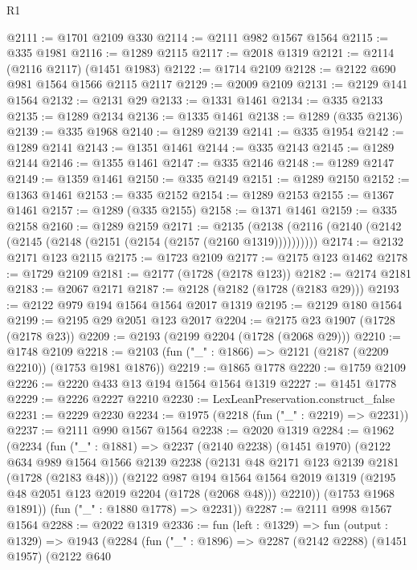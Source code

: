 \begin{lexlean}{R1}
\begin{coremodule}
@2111 := @1701 @2109 @330
@2114 := @2111 @982 @1567 @1564
@2115 := @335 @1981
@2116 := @1289 @2115
@2117 := @2018 @1319
@2121 := @2114 (@2116 @2117) (@1451 @1983)
@2122 := @1714 @2109
@2128 := @2122 @690 @981 @1564 @1566 @2115 @2117
@2129 := @2009 @2109
@2131 := @2129 @141 @1564
@2132 := @2131 @29
@2133 := @1331 @1461
@2134 := @335 @2133
@2135 := @1289 @2134
@2136 := @1335 @1461
@2138 := @1289 (@335 @2136)
@2139 := @335 @1968
@2140 := @1289 @2139
@2141 := @335 @1954
@2142 := @1289 @2141
@2143 := @1351 @1461
@2144 := @335 @2143
@2145 := @1289 @2144
@2146 := @1355 @1461
@2147 := @335 @2146
@2148 := @1289 @2147
@2149 := @1359 @1461
@2150 := @335 @2149
@2151 := @1289 @2150
@2152 := @1363 @1461
@2153 := @335 @2152
@2154 := @1289 @2153
@2155 := @1367 @1461
@2157 := @1289 (@335 @2155)
@2158 := @1371 @1461
@2159 := @335 @2158
@2160 := @1289 @2159
@2171 := @2135 (@2138 (@2116 (@2140 (@2142 (@2145 (@2148 (@2151 (@2154 (@2157 (@2160 @1319))))))))))
@2174 := @2132 @2171 @123 @2115
@2175 := @1723 @2109
@2177 := @2175 @123 @1462
@2178 := @1729 @2109
@2181 := @2177 (@1728 (@2178 @123))
@2182 := @2174 @2181
@2183 := @2067 @2171
@2187 := @2128 (@2182 (@1728 (@2183 @29)))
@2193 := @2122 @979 @194 @1564 @1564 @2017 @1319
@2195 := @2129 @180 @1564
@2199 := @2195 @29 @2051 @123 @2017
@2204 := @2175 @23 @1907 (@1728 (@2178 @23))
@2209 := @2193 (@2199 @2204 (@1728 (@2068 @29)))
@2210 := @1748 @2109
@2218 := @2103 (fun ("_" : @1866) => @2121 (@2187 (@2209 @2210)) (@1753 @1981 @1876))
@2219 := @1865 @1778
@2220 := @1759 @2109
@2226 := @2220 @433 @13 @194 @1564 @1564 @1319
@2227 := @1451 @1778
@2229 := @2226 @2227 @2210
@2230 := LexLeanPreservation.construct_false
@2231 := @2229 @2230
@2234 := @1975 (@2218 (fun ("_" : @2219) => @2231))
@2237 := @2111 @990 @1567 @1564
@2238 := @2020 @1319
@2284 := @1962
    (@2234
      (fun ("_" : @1881) =>
      @2237
        (@2140 @2238)
        (@1451 @1970)
        (@2122
          @634
          @989
          @1564
          @1566
          @2139
          @2238
          (@2131 @48 @2171 @123 @2139 @2181 (@1728 (@2183 @48)))
          (@2122
            @987
            @194
            @1564
            @1564
            @2019
            @1319
            (@2195 @48 @2051 @123 @2019 @2204 (@1728 (@2068 @48)))
            @2210))
        (@1753 @1968 @1891))
      (fun ("_" : @1880 @1778) => @2231))
@2287 := @2111 @998 @1567 @1564
@2288 := @2022 @1319
@2336 := fun (left : @1329) =>
  fun (output : @1329) =>
  @1943
    (@2284
      (fun ("_" : @1896) =>
      @2287
        (@2142 @2288)
        (@1451 @1957)
        (@2122
          @640

\end{coremodule}
\end{lexlean}
